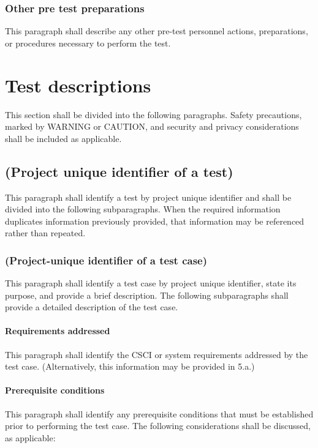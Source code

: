 \documentclass{fidata-report-template}
\begin{document}
\subsubsection{Other pre test preparations}

This paragraph shall describe any other pre-test personnel actions,
preparations, or procedures necessary to perform the test.

\section{Test descriptions}

This section shall be divided into the following paragraphs. Safety
precautions, marked by WARNING or CAUTION, and security and privacy
considerations shall be included as applicable.

\subsection{(Project unique identifier of a test)}

This paragraph shall identify a test by project unique identifier and
shall be divided into the following subparagraphs. When the required
information duplicates information previously provided, that information
may be referenced rather than repeated.

\subsubsection{(Project-unique identifier of a test case)}

This paragraph shall identify a test case by project unique identifier,
state its purpose, and provide a brief description. The following
subparagraphs shall provide a detailed description of the test case.

\paragraph{Requirements addressed}

This paragraph shall identify the CSCI or system requirements addressed
by the test case. (Alternatively, this information may be provided in
5.a.)

\paragraph{Prerequisite conditions}

This paragraph shall identify any prerequisite conditions that must be
established prior to performing the test case. The following
considerations shall be discussed, as applicable:
\end{document}

